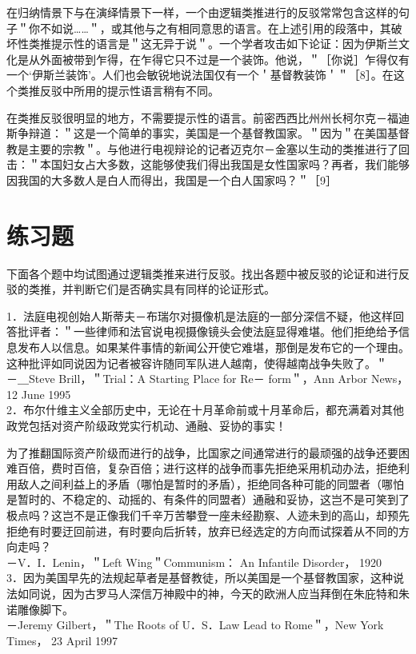 在归纳情景下与在演绎情景下一样，一个由逻辑类推进行的反驳常常包含这样的句子＂你不如说……＂，或其他与之有相同意思的语言。在上述引用的段落中，其破坏性类推提示性的语言是＂这无异于说＂。一个学者攻击如下论证：因为伊斯兰文化是从外面被带到乍得，在乍得它只不过是一个装饰。他说，＂［你说］乍得仅有一个‘伊斯兰装饰’。人们也会敏锐地说法国仅有一个＇基督教装饰＇＂［8］。在这个类推反驳中所用的提示性语言稍有不同。

在类推反驳很明显的地方，不需要提示性的语言。前密西西比州州长柯尔克－福迪斯争辩道：＂这是一个简单的事实，美国是一个基督教国家。＂因为＂在美国基督教是主要的宗教＂。与他进行电视辩论的记者迈克尔－金塞以生动的类推进行了回击：＂本国妇女占大多数，这能够使我们得出我国是女性国家吗？再者，我们能够因我国的大多数人是白人而得出，我国是一个白人国家吗？＂［9］

\section*{练习题}
下面各个题中均试图通过逻辑类推来进行反驳。找出各题中被反驳的论证和进行反驳的类推，并判断它们是否确实具有同样的论证形式。

1．法庭电视创始人斯蒂夫－布瑞尔对摄像机是法庭的一部分深信不疑，他这样回答批评者：＂一些律师和法官说电视摄像镜头会使法庭显得难堪。他们拒绝给予信息发布人以信息。如果某件事情的新闻公开使它难堪，那倒是发布它的一个理由。这种批评如同说因为记者被容许随同军队进人越南，使得越南战争失败了。＂\\
－＿Steve Brill，＂Trial：A Starting Place for Re－ form＂，Ann Arbor News， 12 June 1995\\
2．布尔什维主义全部历史中，无论在十月革命前或十月革命后，都充满着对其他政党包括对资产阶级政党实行机动、通融、妥协的事实！

为了推翻国际资产阶级而进行的战争，比国家之间通常进行的最顽强的战争还要困难百倍，费时百倍，复杂百倍；进行这样的战争而事先拒绝采用机动办法，拒绝利用敌人之间利益上的矛盾（哪怕是暂时的矛盾），拒绝同各种可能的同盟者（哪怕是暂时的、不稳定的、动摇的、有条件的同盟者）通融和妥协，这岂不是可笑到了极点吗？这岂不是正像我们千辛万苦攀登一座未经勘察、人迹未到的高山，却预先拒绝有时要迂回前进，有时要向后折转，放弃已经选定的方向而试探着从不同的方向走吗？\\
－V．I．Lenin，＂Left Wing＂Communism： An Infantile Disorder， 1920\\
3．因为美国早先的法规起草者是基督教徒，所以美国是一个基督教国家，这种说法如同说，因为古罗马人深信万神殿中的神，今天的欧洲人应当拜倒在朱庇特和朱诺雕像脚下。\\
－Jeremy Gilbert，＂The Roots of U．S．Law Lead to Rome＂，New York Times， 23 April 1997

